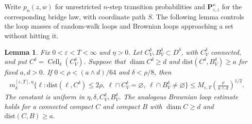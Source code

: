 \documentclass[11pt]{article}
\numberwithin{equation}{section}
\newcommand{\1}{\mathbf{1}}
\newcommand{\dist}{\mathrm{dist}}
\newtheorem{lemma}[theorem]{Lemma}
\newcommand{\diam}{\operatorname{diam}}
\newcommand{\Cell}{\operatorname{Cell}}
\begin{document}
Write \(p_n(z,w)\) for unrestricted \(n\)-step transition probabilities and
\(\mathbf P_{z,z}^n\) for the corresponding bridge law, with coordinate path \(S\). The following lemma controls the loop masses of random-walk loops and Brownian loops approaching a set without hitting it.
\begin{lemma}\label{lem:loop-approach-bound}
Fix \(0<\varepsilon<T<\infty\) and \(\eta>0\).  Let
\(C_V^\delta,B_V^\delta\subset D^\delta\), with \(C_V^\delta\) connected,
and put \(C^\delta=\Cell_\delta(C_V^\delta)\).  Suppose that $\diam C^\delta\geq d$ and $\dist(C^\delta,B_V^\delta)\geq a$
for fixed \(a,d>0\).  If
\(0<\rho<(a\wedge d)/64\) and \(\delta<\rho/8\), then
\begin{align}
 m_\delta^{[\varepsilon,T],\eta}
 \{\ell:\dist(\ell,C^\delta)\leq2\rho,\
          \ell\cap C_V^\delta=\varnothing,\
          \ell\cap B_V^\delta\ne\varnothing\}\leq
 M_{\varepsilon,T}
 \left(\frac{\rho}{a\wedge d}\right)^{1/2}.
 \label{eq:uniform-discrete-near-miss}
\end{align}
The constant is uniform in
\(\eta,\delta,C_V^\delta,B_V^\delta\).  The analogous Brownian loop estimate
holds for a connected compact \(C\) and compact \(B\) with
\(\diam C\geq d\) and \(\dist(C,B)\geq a\).
\end{lemma}
\end{document}
